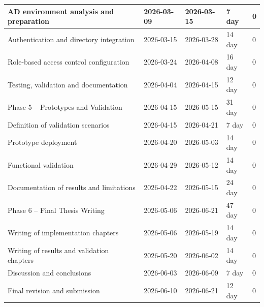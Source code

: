 \documentclass[sigplan]{acmart}
\begin{document}
\begin{table}[!ht]
\begin{tabular}{|l|l|l|l|l|}
        AD environment analysis and preparation & 2026-03-09 & 2026-03-15 & 7 day & 0 \\ \hline
        Authentication and directory integration & 2026-03-15 & 2026-03-28 & 14 day & 0 \\ \hline
        Role-based access control configuration & 2026-03-24 & 2026-04-08 & 16 day & 0 \\ \hline
        Testing, validation and documentation & 2026-04-04 & 2026-04-15 & 12 day & 0 \\ \hline
        Phase 5 – Prototypes and Validation & 2026-04-15 & 2026-05-15 & 31 day & 0 \\ \hline
        Definition of validation scenarios & 2026-04-15 & 2026-04-21 & 7 day & 0 \\ \hline
        Prototype deployment & 2026-04-20 & 2026-05-03 & 14 day & 0 \\ \hline
        Functional validation & 2026-04-29 & 2026-05-12 & 14 day & 0 \\ \hline
        Documentation of results and limitations & 2026-04-22 & 2026-05-15 & 24 day & 0 \\ \hline
        Phase 6 – Final Thesis Writing & 2026-05-06 & 2026-06-21 & 47 day & 0 \\ \hline
        Writing of implementation chapters & 2026-05-06 & 2026-05-19 & 14 day & 0 \\ \hline
        Writing of results and validation chapters & 2026-05-20 & 2026-06-02 & 14 day & 0 \\ \hline
        Discussion and conclusions & 2026-06-03 & 2026-06-09 & 7 day & 0 \\ \hline
        Final revision and submission & 2026-06-10 & 2026-06-21 & 12 day & 0 \\ \hline
    \end{tabular}
\end{table}
\end{document}
